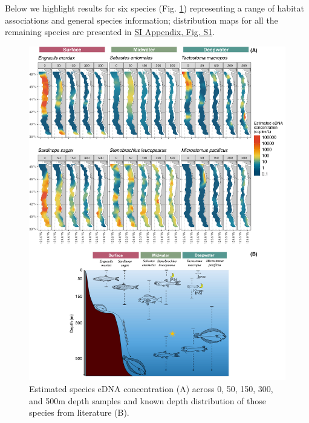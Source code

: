 \documentclass[9pt,twocolumn,twoside]{pnas-new}
\begin{document}
Below we highlight results for six species (Fig. \ref{fig:fig1}) representing a range of habitat associations and general species information; distribution maps for all the remaining species are presented in \href{SI_Appendix.pdf}{SI Appendix, Fig. S1}.

\begin{figure}[tbhp]  %
\centering
\includegraphics[width=16cm]{plots/1_Figure_1.jpg}  %
\caption{Estimated species eDNA concentration (A) across 0, 50, 150, 300, and 500m depth samples and known depth distribution of those species from literature (B).}
\label{fig:fig1}
\end{figure}
\end{document}
